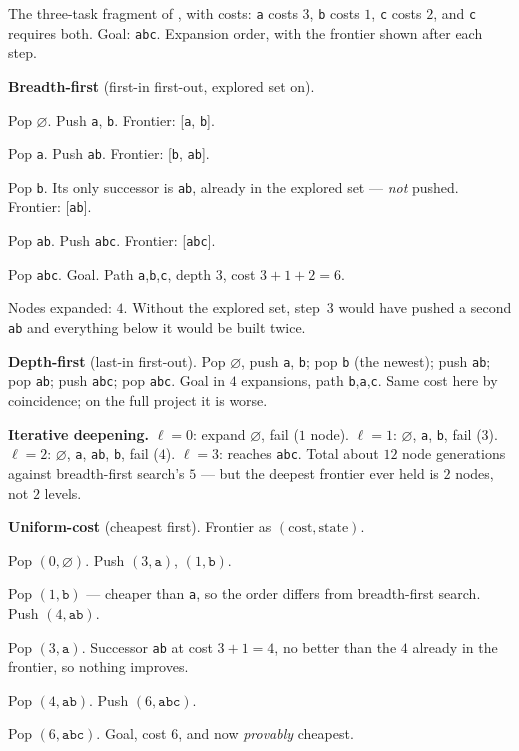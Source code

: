 \begin{worked}
The three-task fragment of , with costs: \texttt{a} costs $3$,
\texttt{b} costs $1$, \texttt{c} costs $2$, and \texttt{c} requires both. Goal:
\texttt{abc}. Expansion order, with the frontier shown after each step.

\smallskip
\textbf{Breadth-first} (first-in first-out, explored set on).
\begin{tight}
  \item Pop $\varnothing$. Push \texttt{a}, \texttt{b}. Frontier:
        [\texttt{a}, \texttt{b}].
  \item Pop \texttt{a}. Push \texttt{ab}. Frontier: [\texttt{b}, \texttt{ab}].
  \item Pop \texttt{b}. Its only successor is \texttt{ab}, already in the explored
        set --- \emph{not} pushed. Frontier: [\texttt{ab}].
  \item Pop \texttt{ab}. Push \texttt{abc}. Frontier: [\texttt{abc}].
  \item Pop \texttt{abc}. Goal. Path \texttt{a},\texttt{b},\texttt{c}, depth $3$,
        cost $3+1+2=6$.
\end{tight}
Nodes expanded: $4$. Without the explored set, step~3 would have pushed a second
\texttt{ab} and everything below it would be built twice.

\smallskip
\textbf{Depth-first} (last-in first-out).
Pop $\varnothing$, push \texttt{a}, \texttt{b}; pop \texttt{b} (the newest); push
\texttt{ab}; pop \texttt{ab}; push \texttt{abc}; pop \texttt{abc}. Goal in $4$
expansions, path \texttt{b},\texttt{a},\texttt{c}. Same cost here by coincidence;
on the full project it is worse.

\smallskip
\textbf{Iterative deepening.}
$\ell=0$: expand $\varnothing$, fail ($1$ node). $\ell=1$: $\varnothing$,
\texttt{a}, \texttt{b}, fail ($3$). $\ell=2$: $\varnothing$, \texttt{a},
\texttt{ab}, \texttt{b}, fail ($4$). $\ell=3$: reaches \texttt{abc}. Total about
$12$ node generations against breadth-first search's $5$ --- but the deepest
frontier ever held is $2$ nodes, not $2$ levels.

\smallskip
\textbf{Uniform-cost} (cheapest first). Frontier as
$(\text{cost},\text{state})$.
\begin{tight}
  \item Pop $(0,\varnothing)$. Push $(3,\texttt{a})$, $(1,\texttt{b})$.
  \item Pop $(1,\texttt{b})$ --- cheaper than \texttt{a}, so the order differs from
        breadth-first search. Push $(4,\texttt{ab})$.
  \item Pop $(3,\texttt{a})$. Successor \texttt{ab} at cost $3+1=4$, no better than
        the $4$ already in the frontier, so nothing improves.
  \item Pop $(4,\texttt{ab})$. Push $(6,\texttt{abc})$.
  \item Pop $(6,\texttt{abc})$. Goal, cost $6$, and now \emph{provably} cheapest.
\end{tight}


\end{worked}
